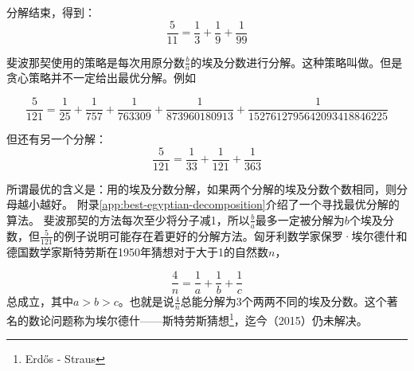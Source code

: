 \documentclass[b5paper]{ctexart}
\begin{document}
分解结束，得到：
\[
\frac{5}{11} = \frac{1}{3} + \frac{1}{9} + \frac{1}{99}
\]

斐波那契使用的策略是每次用原分数$\frac{b}{a}$的埃及分数进行分解。这种策略叫做。但是贪心策略并不一定给出最优分解。例如

\[
\frac{5}{121} = \frac{1}{25} + \frac{1}{757} + \frac{1}{763309} + \frac{1}{873960180913} + \frac{1}{1527612795642093418846225}
\]

但还有另一个分解：
\[
\frac{5}{121} = \frac{1}{33} + \frac{1}{121} + \frac{1}{363}
\]

所谓最优的含义是：用的埃及分数分解，如果两个分解的埃及分数个数相同，则分母越小越好。
附录\ref{app:best-egyptian-decomposition}介绍了一个寻找最优分解的算法。
斐波那契的方法每次至少将分子减1，所以$\frac{b}{a}$最多一定被分解为$b$个埃及分数，但$\frac{5}{121}$的例子说明可能存在着更好的分解方法。匈牙利数学家保罗·埃尔德什和德国数学家斯特劳斯在1950年猜想对于大于1的自然数$n$，

\[
\frac{4}{n} = \frac{1}{a} + \frac{1}{b} + \frac{1}{c}
\]
总成立，其中$a > b > c$。也就是说$\frac{4}{n}$总能分解为3个两两不同的埃及分数。这个著名的数论问题称为埃尔德什——斯特劳斯猜想\footnote{Erdős - Straus}，迄今（2015）仍未解决。
\end{document}
